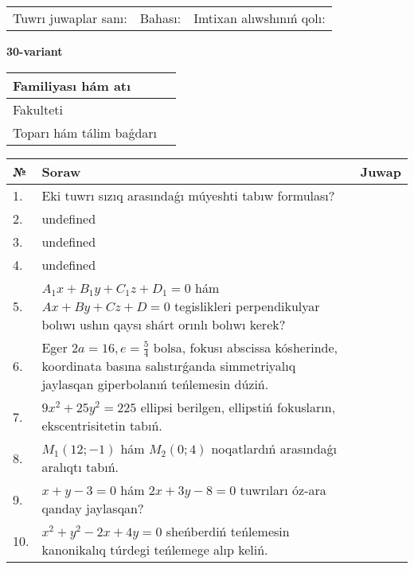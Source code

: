 \documentclass{article}
\begin{document}
\vspace{0.7cm}

\begin{tabular}{lll}
Tuwrı juwaplar sanı: \underline{\hspace{1cm}} & 
Bahası: \underline{\hspace{1cm}} & 
Imtixan alıwshınıń qolı: \underline{\hspace{2cm}} \\
\end{tabular}

\egroup

\newpage


\textbf{30-variant}\\

\bgroup
\def\arraystretch{1.6} %

\begin{tabular}{|m{5.7cm}|m{9.5cm}|}
\hline
Familiyası hám atı & \\
\hline
Fakulteti  & \\
\hline
Toparı hám tálim baǵdarı  & \\
\hline
\end{tabular}

\vspace{0.7cm}

\begin{tabular}{|m{0.7cm}|m{10cm}|m{4cm}|}
\hline
№ & Soraw & Juwap \\
\hline
1. & Eki tuwrı sızıq arasındaǵı múyeshti tabıw formulası? &  \\
\hline
2. & undefined &  \\
\hline
3. & undefined &  \\
\hline
4. & undefined &  \\
\hline
5. & \(A_{1}x + B_{1}y + C_{1}z + D_{1} = 0\) hám \(Ax + By + Cz + D = 0\) tegislikleri perpendikulyar bolıwı ushın qaysı shárt orınlı bolıwı kerek? &  \\
\hline
6. & Eger \(2 a = 16, e = \frac{5}{4}\) bolsa, fokusı abscissa kósherinde, koordinata basına salıstırǵanda simmetriyalıq jaylasqan giperbolanıń teńlemesin dúziń. &  \\
\hline
7. & \(9 x^{2} + 25 y^{2} = 225\) ellipsi berilgen, ellipstiń fokusların, ekscentrisitetin tabıń. &  \\
\hline
8. & \(M_{1} (12; - 1)\) hám \(M_{2} (0;4)\) noqatlardıń arasındaǵı aralıqtı tabıń. &  \\
\hline
9. & \(x + y - 3 = 0\) hám \(2 x + 3 y - 8 = 0\) tuwrıları óz-ara qanday jaylasqan? &  \\
\hline
10. & \(x^{2} + y^{2} - 2 x + 4 y = 0\) sheńberdiń teńlemesin kanonikalıq túrdegi teńlemege alıp keliń. & \\
\hline
\end{tabular}
\end{document}

